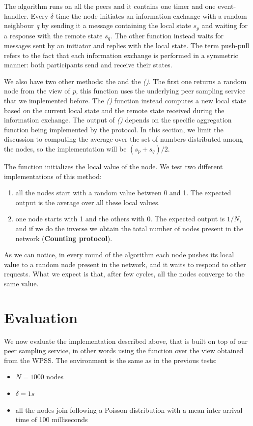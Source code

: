 The algorithm runs on all the peers and it contains one timer and one event-handler. Every $\delta$ time the node initiates an information exchange with a random neighbour \textit{q} by sending it a message containing the local state $s_p$ and waiting for a response with the remote state $s_q$. The other function instead waits for messages sent by an initiator and replies with the local state. The term push-pull refers to the fact that each information exchange is performed in a symmetric manner: both participants send and receive their states.

We also have two other methods: the \getNeighbour and the \update\textsf{\textit{()}}. The first one returns a random node from the view of \textit{p}, this function uses the underlying peer sampling service that we implemented before. The \update\textsf{\textit{()}} function instead computes a new local state based on the current local state and the remote state received during the information exchange. The output of \update\textsf{\textit{()}} depends on the specific aggregation function being implemented by the protocol. In this section, we limit the discussion to computing the average over the set of numbers distributed among the nodes, so the implementation will be $(s_p + s_q) / 2$. 

The \init function initializes the local value of the node. We test two different implementations of this method: 
\begin{enumerate}
	\item all the nodes start with a random value between 0 and 1. The expected output is the average over all these local values.
	\item one node starts with 1 and the others with 0. The expected output is $1/N$, and if we do the inverse we obtain the total number of nodes present in the network (\textbf{Counting protocol}).
\end{enumerate}

As we can notice, in every round of the algorithm each node pushes its local value to a random node present in the network, and it waits to respond to other requests. What we expect is that, after few cycles, all the nodes converge to the same value. 

\section{Evaluation}
\label{sec:evaluation_aggregation}
We now evaluate the implementation described above, that is built on top of our peer sampling service, in other words using the \getNeighbour function over the view obtained from the \ac{WPSS}. The environment is the same as in the previous tests:
\begin{itemize}
	\item $N = 1000$ nodes
	\item $\delta = 1s$
	\item all the nodes join following a Poisson distribution with a mean inter-arrival time of 100 milliseconds
\end{itemize}

